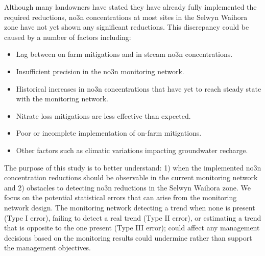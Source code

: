 Although many landowners have stated they have already fully implemented the required reductions\citep{scottpc}, \gls{no3n} concentrations at most sites in the Selwyn Waihora zone have not yet shown any significant reductions\citep{scottpc}.
This discrepancy could be caused by a number of factors including:
\begin{itemize}
    \item Lag between on farm mitigations and in stream \gls{no3n} concentrations.
    \item Insufficient precision in the \gls{no3n} monitoring network.
    \item Historical increases in \gls{no3n} concentrations that have yet to reach steady state with the monitoring network.
    \item Nitrate loss mitigations are less effective than expected.
    \item Poor or incomplete implementation of on-farm mitigations.
    \item Other factors such as climatic variations impacting groundwater recharge.
\end{itemize}
The purpose of this study is to better understand: 1) when the implemented \gls{no3n} concentration reductions should be observable in the current monitoring network and 2) obstacles to detecting \gls{no3n} reductions in the Selwyn Waihora zone.
We focus on the potential statistical errors that can arise from the monitoring network design.
The monitoring network detecting a trend when none is present (Type I error), failing to detect a real trend (Type II error), or estimating a trend that is opposite to the one present (Type III error); could affect any management decisions based on the monitoring results could undermine rather than support the management objectives.
